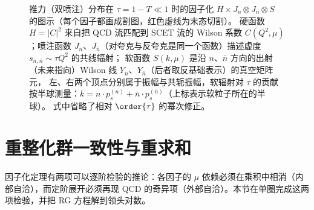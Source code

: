 \begin{figure}[htbp]
\caption{推力（双喷注）分布在 $\tau=1-T\ll1$ 时的因子化 $H\times J_n\otimes J_{\bar n}\otimes S$ 的图示（每个因子都画成割图，红色虚线为末态切割）。
硬函数 $H=|C|^2$ 来自把 QCD 流匹配到 SCET 流的 Wilson 系数 $C(Q^2,\mu)$；喷注函数 $J_n$、$J_{\bar n}$（对夸克与反夸克是同一个函数）描述虚度 $s_{n,\bar n}\sim\tau Q^2$ 的共线辐射；
软函数 $S(k,\mu)$ 是沿 $n$、$\bar n$ 方向的出射（未来指向）Wilson 线 $Y_n$、$Y_{\bar n}$（后者取反基础表示）的真空矩阵元，
左、右两个顶点分别属于振幅与共轭振幅，软辐射对 $\tau$ 的贡献按半球测量：$k=n\cdot p_{s}^{(n)}+\bar n\cdot p_{s}^{(\bar n)}$（上标表示软粒子所在的半球）。
式中省略了相对 $\order{\tau}$ 的幂次修正。}
\label{fig:dijet-factorization}
\end{figure}

\section{重整化群一致性与重求和}\label{sec:scet-rg}

因子化定理有两项可以逐阶检验的推论：各因子的 $\mu$ 依赖必须在乘积中相消（内部自洽），而定阶展开必须再现 QCD 的奇异项（外部自洽）。本节在单圈完成这两项检验，并把 RG 方程解到领头对数。

